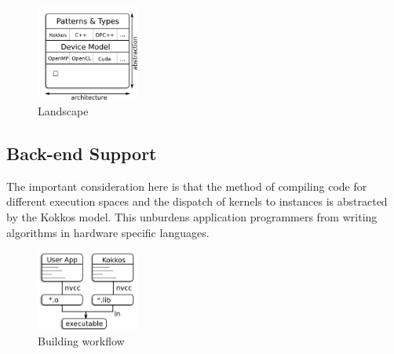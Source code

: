 

\begin{figure}
\centerline{\includegraphics[width=0.3\textwidth]{img/Stack.png}}
\caption{Landscape}
\label{fig:stack}
\end{figure}


\subsection{Back-end Support}\label{chap:kokkosBackend}


The important consideration here is that the method of compiling code for different execution spaces and the dispatch of kernels to instances is abstracted by the Kokkos model. This unburdens application programmers from writing algorithms in hardware specific languages.


\begin{figure}
\centerline{\includegraphics[width=0.3\textwidth]{img/Build.png}}
\caption{Building workflow}
\label{fig}
\end{figure}

